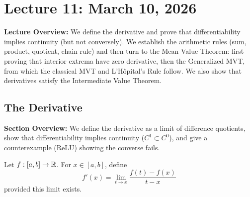 \documentclass[../master/master.tex]{subfiles}
\begin{document}
\renewcommand{\lecturenum}{11}
\renewcommand{\lecturedate}{March 10, 2026}
\renewcommand{\lecturetopic}{Differentiation and the Mean Value Theorem}

\section{Lecture \lecturenum : \lecturedate}

\begin{lecturesummary}
\textbf{Lecture Overview:} We define the derivative and prove that differentiability implies continuity (but not conversely). We establish the arithmetic rules (sum, product, quotient, chain rule) and then turn to the Mean Value Theorem: first proving that interior extrema have zero derivative, then the Generalized MVT, from which the classical MVT and L'H\^opital's Rule follow. We also show that derivatives satisfy the Intermediate Value Theorem.
\end{lecturesummary}

\subsection{The Derivative}

\begin{summarybox}
\textbf{Section Overview:} We define the derivative as a limit of difference quotients, show that differentiability implies continuity ($C^1 \subset C^0$), and give a counterexample (ReLU) showing the converse fails.
\end{summarybox}

\begin{definition}
Let $f: [a,b] \to \mathbb{R}$. For $x \in [a,b]$, define
\[
f'(x) = \lim_{t \to x} \frac{f(t) - f(x)}{t - x}
\]
provided this limit exists.
\end{definition}
\end{document}
